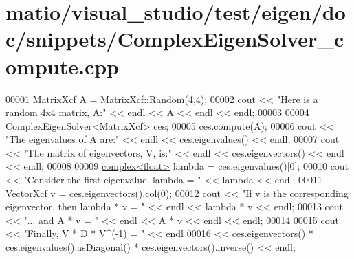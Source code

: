 \hypertarget{matio_2visual__studio_2test_2eigen_2doc_2snippets_2_complex_eigen_solver__compute_8cpp_source}{}\section{matio/visual\+\_\+studio/test/eigen/doc/snippets/\+Complex\+Eigen\+Solver\+\_\+compute.cpp}
\label{matio_2visual__studio_2test_2eigen_2doc_2snippets_2_complex_eigen_solver__compute_8cpp_source}

\begin{DoxyCode}
00001 MatrixXcf A = MatrixXcf::Random(4,4);
00002 cout << \textcolor{stringliteral}{"Here is a random 4x4 matrix, A:"} << endl << A << endl << endl;
00003 
00004 ComplexEigenSolver<MatrixXcf> ces;
00005 ces.compute(A);
00006 cout << \textcolor{stringliteral}{"The eigenvalues of A are:"} << endl << ces.eigenvalues() << endl;
00007 cout << \textcolor{stringliteral}{"The matrix of eigenvectors, V, is:"} << endl << ces.eigenvectors() << endl << endl;
00008 
00009 \hyperlink{structcomplex}{complex<float>} lambda = ces.eigenvalues()[0];
00010 cout << \textcolor{stringliteral}{"Consider the first eigenvalue, lambda = "} << lambda << endl;
00011 VectorXcf v = ces.eigenvectors().col(0);
00012 cout << \textcolor{stringliteral}{"If v is the corresponding eigenvector, then lambda * v = "} << endl << lambda * v << endl;
00013 cout << \textcolor{stringliteral}{"... and A * v = "} << endl << A * v << endl << endl;
00014 
00015 cout << \textcolor{stringliteral}{"Finally, V * D * V^(-1) = "} << endl
00016      << ces.eigenvectors() * ces.eigenvalues().asDiagonal() * ces.eigenvectors().inverse() << endl;
\end{DoxyCode}

